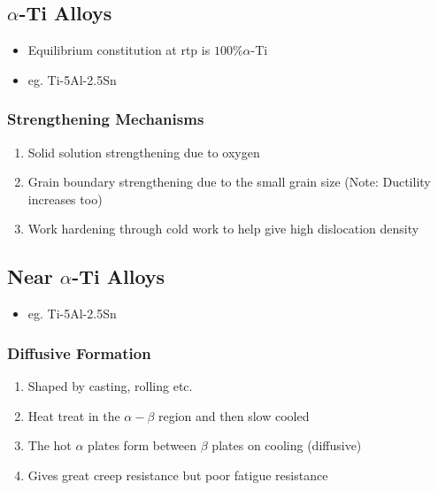 \subsection{$\alpha$-Ti Alloys} %
\label{sub:alpha_alloys}
\begin{itemize}
  \item Equilibrium constitution at rtp is $100\% \alpha$-Ti
  \item eg. Ti-5Al-2.5Sn
\end{itemize}

\subsubsection{Strengthening Mechanisms} %
\label{ssub:strengthening_mechanisms}

\begin{enumerate}
  \item Solid solution strengthening due to oxygen
  \item Grain boundary strengthening due to the small grain size (Note: Ductility increases too)
  \item Work hardening through cold work to help give high dislocation density
\end{enumerate}


\subsection{Near $\alpha$-Ti Alloys} %
\label{sub:near_}

\begin{itemize}
  \item eg. Ti-5Al-2.5Sn
\end{itemize}

\subsubsection{Diffusive Formation} %
\label{ssub:formation}

\begin{enumerate}
  \item Shaped by casting, rolling etc.
  \item Heat treat in the $\alpha-\beta$ region and then slow cooled
  \item The hot $\alpha$ plates form between $\beta$ plates on cooling (diffusive)
  \item Gives great creep resistance but poor fatigue resistance
\end{enumerate}

